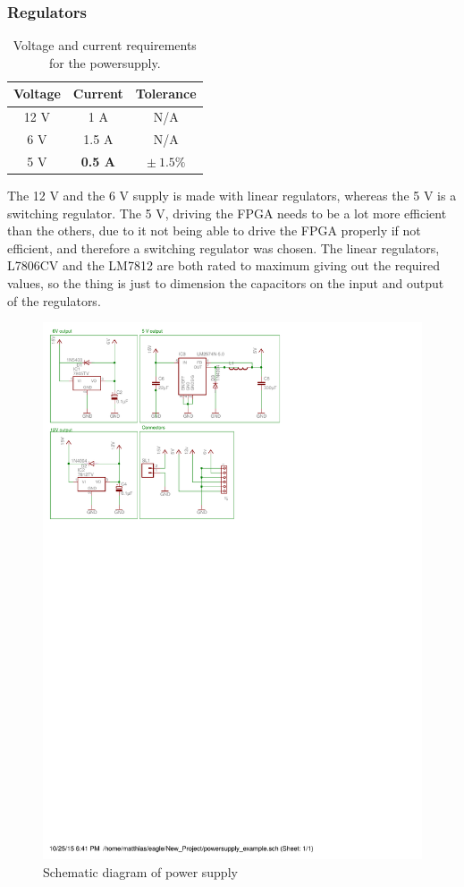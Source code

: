 \subsubsection{Regulators}
\begin{table}
\caption{Voltage and current requirements for the powersupply.}
\label{tab::power_req}
 \vspace{5 pt}
 \begin{tabular}{ccc}
  Voltage & Current & Tolerance \\
 \toprule
  12 V & 1 A & N/A \\
  6 V & 1.5 A & N/A \\
  5 V & \textbf{0.5 A} & $\pm\ 1.5 \%$ \\
  \bottomrule
 \end{tabular}
\end{table}
The 12 V and the 6 V supply is made with linear regulators, whereas the 5 V is a switching regulator. The 5 V, driving the FPGA needs to be a lot more efficient than the others, due to it not being able to drive the FPGA properly if not efficient, and therefore a switching regulator was chosen. The linear regulators, L7806CV and the LM7812 are both rated to maximum giving out the required values, so the thing is just to dimension the capacitors on the input and output of the regulators. 
\begin{figure}[H]
\includegraphics[scale=0.8,trim={0 19cm 0 0}]{img/powersupply.pdf}
\caption{Schematic diagram of power supply}
\label{fig::sch_power}
\end{figure}

